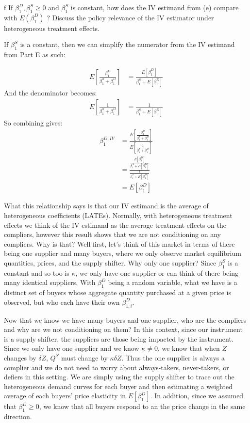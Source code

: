 \documentclass{article}
\begin{document}
\begin{problem}{f}
If $\beta_{1}^{D}, \beta_{1}^{S} \geq 0$ and $\beta_{1}^{S}$ is constant, how does the IV estimand from (e) compare with $E\left(\beta_{1}^{D}\right)$ ? Discuss the policy relevance of the IV estimator under heterogeneous treatment effects.
\end{problem}
\begin{solution}
If $\beta_1^S$ is a constant, then we can simplify the numerator from the IV estimand from Part E as such:

\begin{align*}
    E\left [ \frac{\beta_1^D}{\beta_1^S+\beta_1^D} \right] &=  \frac{E[\beta_1^D]}{\beta_1^S+E[\beta_1^D]}
\end{align*}
And the denominator becomes:
\begin{align*}
    E\left[ \frac{1}{\beta_1^S+\beta_1^D}\right] &=  \frac{1}{\beta_1^S+E[\beta_1^D]}
\end{align*}
So combining gives:
\begin{align*}
    \beta_1^{D,IV} &= \frac{E\left [ \frac{\beta_1^D}{\beta_1^S+\beta_1^D} \right]}{E\left[ \frac{1}{\beta_1^S+\beta_1^D}\right]} \tag{Part E answer} \\
    &=\frac{\frac{E[\beta_1^D]}{\beta_1^S+E[\beta_1^D]}}{\frac{1}{\beta_1^S+E[\beta_1^D]}} \\
    &= E[\beta_1^D]
\end{align*}
\end{solution}
What this relationship says is that our IV estimand is the average of heterogeneous coefficients (LATEs). Normally, with heterogeneous treatment effects we think of the IV estimand as the average treatment effects on the compliers, however this result shows that we are not conditioning on any compliers. Why is that? Well first, let's think of this market in terms of there being one supplier and many buyers, where we only observe market equilibrium quantities, prices, and the supply shifter. Why only one supplier? Since $\beta_1^S$ is a constant and so too is $\kappa$, we only have one supplier or can think of there being many identical suppliers. With $\beta_1^D$ being a random variable, what we have is a distinct set of buyers whose aggregate quantity purchased at a given price is observed, but who each have their own $\beta_{1,i}^D$. 

Now that we know we have many buyers and one supplier, who are the compliers and why are we not conditioning on them? In this context, since our instrument is a supply shifter, the suppliers are those being impacted by the instrument. Since we only have one supplier and we know $\kappa\neq 0$, we know that when $Z$ changes by $\delta Z$, $Q^S$ must change by $\kappa \delta Z$. Thus the one supplier is always a complier and we do not need to worry about always-takers, never-takers, or defiers in this setting. We are simply using the supply shifter to trace out the heterogeneous demand curves for each buyer and then estimating a weighted average of each buyers' price elasticity in $E[\beta_1^D]$. In addition, since we assumed that $\beta_1^D \geq 0$, we know that all buyers respond to an the price change in the same direction.
\end{document}
